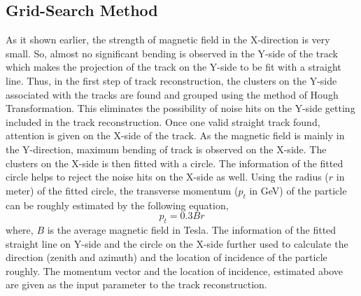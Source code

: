\subsection{Grid-Search Method}
As it shown earlier, the strength of magnetic field in the
X-direction is very small. So, almost no significant bending is
observed in the Y-side of the track which makes the projection of
the track on the Y-side to be fit with a straight line.
Thus, in the first step of track reconstruction, the clusters on
the Y-side associated with the tracks are found and grouped using
the method of Hough Transformation\cite{hought}. This eliminates
the possibility of noise hits on the Y-side getting included in the
track reconstruction. Once one valid straight track found, attention
is given on the X-side of the track. As the magnetic field is mainly
in the Y-direction, maximum bending of track is observed on the X-side.
The clusters on the X-side is then fitted with a circle.
The information of the fitted circle helps to reject the noise hits
on the X-side as well.
Using the radius ($r$ in meter) of the fitted circle, the transverse
momentum ($p_t$ in GeV) of the particle can be roughly estimated by
the following equation,
\begin{equation}
  p_{t}=0.3Br \label{eq:pt_est}
\end{equation}
where, $B$ is the average magnetic field in Tesla.
The information of the fitted straight line on Y-side and the circle
on the X-side further used to calculate the direction (zenith and
azimuth) and the location of incidence of the particle roughly.
The momentum vector and the location of incidence, estimated
above are given as the input parameter to the track reconstruction.



